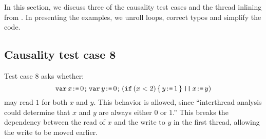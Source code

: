 In this section, we discuss three of the causality test cases and the thread
inlining from \cite{Manson:2005:JMM:1047659.1040336}.  In presenting the
examples, we unroll loops, correct typos and simplify the code.  

\subsection{Causality test case 8}

Test case 8 asks whether:
\begin{displaymath}
  \texttt{var}\, x\texttt{:}\mkern-1mu\texttt{=}\, 0\texttt{;}\,
  \texttt{var}\, y\texttt{:}\mkern-1mu\texttt{=}\, 0\texttt{;}\,
  (\texttt{if}\,(x<2)\,\{\, y\texttt{:}\mkern-1mu\texttt{=}\, 1\,\} 
  \,\texttt{|}\texttt{|}\,
  x\texttt{:}\mkern-1mu\texttt{=}\, y)
\end{displaymath}
may read $1$ for both $x$ and $y$.  This behavior is allowed, since
``interthread analysis could determine that $x$ and $y$ are always either $0$
or $1$.''  This breaks the dependency between the read of $x$ and the write
to $y$ in the first thread, allowing the write to be moved earlier.

